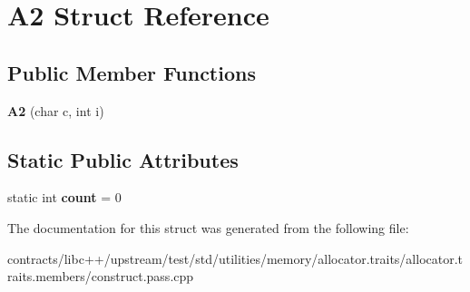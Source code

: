 \hypertarget{struct_a2}{}\section{A2 Struct Reference}
\label{struct_a2}
\subsection*{Public Member Functions}
\begin{DoxyCompactItemize}
\item 
\mbox{\label{struct_a2_a0c8546848d4ceb0b4cfcca30dec35bdb}} 
{\bfseries A2} (char c, int i)
\end{DoxyCompactItemize}
\subsection*{Static Public Attributes}
\begin{DoxyCompactItemize}
\item 
\mbox{\label{struct_a2_a7a2ad0a149652e897b9929d2da36bc1b}} 
static int {\bfseries count} = 0
\end{DoxyCompactItemize}


The documentation for this struct was generated from the following file\+:\begin{DoxyCompactItemize}
\item 
contracts/libc++/upstream/test/std/utilities/memory/allocator.\+traits/allocator.\+traits.\+members/construct.\+pass.\+cpp\end{DoxyCompactItemize}
